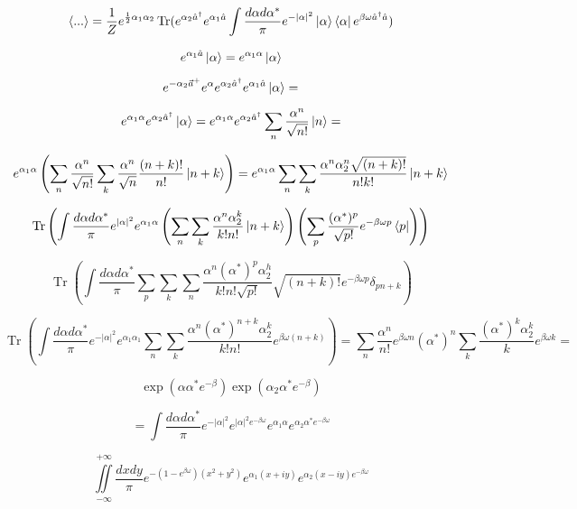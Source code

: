 \begin{problem}
		$$ 
			\langle
			...
			\rangle
			= \frac{1}{Z}e^{\frac{1}{2} \alpha_{1} \alpha_{2}}\operatorname{Tr}(e^{\alpha_{2} \hat{a}^{\dagger}}e^{\alpha_{1} \hat{a}} \int \frac{d \alpha d \alpha^{*}}{\pi}e^{-|\alpha|^2} \ket{\alpha}\bra{\alpha} e^{\beta \omega \hat{a}^\dagger \hat{a}} )
		$$
		
		$$
			e^{\alpha_{1} \hat{a}}\ket{\alpha} = e^{\alpha_{1} \alpha} \ket{\alpha}$$
		
		
		$$
			e^{-\alpha_{2} \vec{a}^{+}} e^{\alpha }
			e^{\alpha_{2}\hat{a}^{\dagger}}e^{\alpha_{1}\hat{a}}\ket{\alpha} =$$ 
			
		$$ e^{
			\alpha_{1}\alpha} e^{\alpha_{2} \hat{a}^{\dagger}}\ket{\alpha} = e^{\alpha_{1} \alpha} e^{\alpha_{2} \hat{a}^{\dagger}}\sum_{n} \frac{\alpha^n}{\sqrt{n!}} \ket{n} =
		$$
		
		$$
		 e^{\alpha_1 \alpha}\left(\sum_{n} \frac{\alpha^n}{\sqrt{n!}} \sum_{k} \frac{\alpha^n}{\sqrt{n}} \frac{(n+k)!}{n!} \ket{n+k}  \right) = e^{\alpha_{1} \alpha} \sum_{n} \sum_{k} \frac{
	\alpha^n \alpha_{2}^n \sqrt{(n+k)!}}{n!k!} \ket{n+k}
		$$
	
		$$
		\operatorname{Tr}\left(\int \frac{d \alpha d \alpha^{*}}{\pi} e^{|\alpha|^2} e^{\alpha_{1} \alpha} \left( \sum_{n} \sum_{k} \frac{\alpha^n \alpha^{k}_{2}}{k! n!}\ket{n+k}\right) \left(\sum_{p} \frac{(\alpha^{*})^p}{\sqrt{p!}} e^{-\beta \omega p} \bra{p} \right) \right)
		$$
		
		$$
			\operatorname{Tr}\left(\int \frac{d \alpha d \alpha^{*}}{\pi} \sum_{p} \sum_{k} \sum_{n} \frac{\alpha^n (\alpha^{*})^p \alpha^{h}_{2}}{k! n! \sqrt{p!}} \sqrt{(n+k)!} e^{-\beta \omega p} \delta_{p n+k}\right)
		$$
		
		$$
		\operatorname{Tr}(\int \frac{d \alpha d \alpha^{*}}{\pi} e^{-|\alpha|^2} e^{\alpha_{1} \alpha_{1}} \sum_n \sum_k \frac{\alpha^n (\alpha^{*})^{n+k} \alpha^k_{2}}{k! n! } e^{\beta \omega (n+k)}) = \sum_{n} \frac{\alpha^n}{n!} e^{\beta \omega n} (\alpha^{*})^n \sum_{k} \frac{(\alpha^{*})^k \alpha_{2}^k}{k} e^{\beta \omega k} =
		$$
		
		$$
		 \exp(\alpha \alpha^{*} e^{-\beta})\exp(\alpha_{2} \alpha^{*} e^{-\beta})
		$$
		
		$$
		= \int \frac{d \alpha d \alpha^{*}}{\pi} e^{-|\alpha|^2}e^{|\alpha|^2 e^{-\beta \omega}} e^{\alpha_1 \alpha} e^{\alpha_{2} \alpha^{*} e^{-\beta \omega}}
		$$
		
		$$
		\iint \limits_{-\infty}^{+\infty} \frac{dx dy}{\pi} e^{-(1-e^{\beta \omega})(x^2+y^2)}e^{\alpha_{1}(x+iy)}e^{\alpha_{2}(x-iy)e^{-\beta \omega}}
		$$
		

\end{problem}
